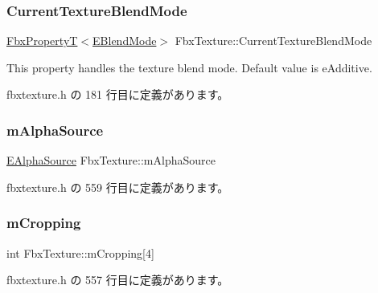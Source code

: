 \subsubsection{\texorpdfstring{Current\+Texture\+Blend\+Mode}{CurrentTextureBlendMode}}
{\footnotesize\ttfamily \hyperlink{class_fbx_property_t}{Fbx\+PropertyT}$<$\hyperlink{class_fbx_texture_af1e8597086589ba6b8ba0066d47b6b63}{E\+Blend\+Mode}$>$ Fbx\+Texture\+::\+Current\+Texture\+Blend\+Mode}

This property handles the texture blend mode. Default value is e\+Additive. 

 fbxtexture.\+h の 181 行目に定義があります。

\mbox{\label{class_fbx_texture_a2d708745702a77f5f47e6d65763923fb}} 
\subsubsection{\texorpdfstring{m\+Alpha\+Source}{mAlphaSource}}
{\footnotesize\ttfamily \hyperlink{class_fbx_texture_a12777ea406718d186e21b9656716171d}{E\+Alpha\+Source} Fbx\+Texture\+::m\+Alpha\+Source\hspace{0.3cm}{\ttfamily [protected]}}



 fbxtexture.\+h の 559 行目に定義があります。

\mbox{\label{class_fbx_texture_abba1ab39aa33baa722b9707363d80b44}} 
\subsubsection{\texorpdfstring{m\+Cropping}{mCropping}}
{\footnotesize\ttfamily int Fbx\+Texture\+::m\+Cropping\mbox{[}4\mbox{]}\hspace{0.3cm}{\ttfamily [protected]}}



 fbxtexture.\+h の 557 行目に定義があります。

\mbox{\label{class_fbx_texture_aed526c6181680a2b7da6eae7c8723a6d}} 
